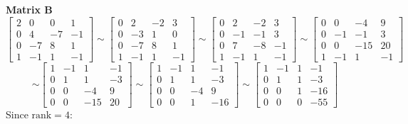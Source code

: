 \documentclass{article}
\begin{document}
\noindent\textbf{Matrix B}
$$
\begin{bmatrix} 2 & 0 & 0 & 1 \\ 0 & 4 & -7 & -1 \\ 0 & -7 & 8 & 1 \\ 1 & -1 & 1 & -1 \end{bmatrix} \sim
\begin{bmatrix} 0 & 2 & -2 & 3 \\ 0 & -3 & 1 & 0 \\ 0 & -7 & 8 & 1 \\ 1 & -1 & 1 & -1 \end{bmatrix} \sim
\begin{bmatrix} 0 & 2 & -2 & 3 \\ 0 & -1 & -1 & 3 \\ 0 & 7 & -8 & -1 \\ 1 & -1 & 1 & -1 \end{bmatrix} \sim
\begin{bmatrix} 0 & 0 & -4 & 9 \\ 0 & -1 & -1 & 3 \\ 0 & 0 & -15 & 20 \\ 1 & -1 & 1 & -1 \end{bmatrix}
$$ $$ \sim
\begin{bmatrix} 1 & -1 & 1 & -1 \\ 0 & 1 & 1 & -3 \\ 0 & 0 & -4 & 9 \\ 0 & 0 & -15 & 20 \end{bmatrix} \sim
\begin{bmatrix} 1 & -1 & 1 & -1 \\ 0 & 1 & 1 & -3 \\ 0 & 0 & -4 & 9 \\ 0 & 0 & 1 & -16 \end{bmatrix} \sim
\begin{bmatrix} 1 & -1 & 1 & -1 \\ 0 & 1 & 1 & -3 \\ 0 & 0 & 1 & -16 \\ 0 & 0 & 0 & -55 \end{bmatrix}
$$
Since $\text{rank} = 4$:
\end{document}
